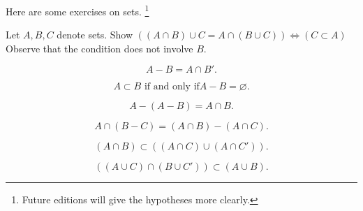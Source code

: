 

Here are some exercises on sets.
  \ifhmode\unskip\fi\footnote{
Future editions will give the hypotheses more clearly.
  }

\begin{exercise}
Let $A, B, C$ denote sets.
Show $((A \cap B) \cup C = A \cap (B \cup C)) \iff (C \subset A)$
Observe that the condition does not involve $B$.
\end{exercise}

\begin{exercise}
  \[
A - B = A \cap B'.
  \]
\end{exercise}

\begin{exercise}
\[
A \subset B \text{ if and only if} A - B = \varnothing.
\]
\end{exercise}

\begin{exercise}
\[
A - (A - B) = A \cap B.
\]
\end{exercise}

\begin{exercise}
\[
A \cap (B - C) = (A \cap B) - (A \cap C).
\]
\end{exercise}

\begin{exercise}
  \[
(A \cap B) \subset ((A \cap C) \cup (A \cap C')).
  \]
\end{exercise}

\begin{exercise}
\[
((A \cup C) \cap (B \cup C')) \subset (A \cup B).
\]
\end{exercise}

\blankpage
